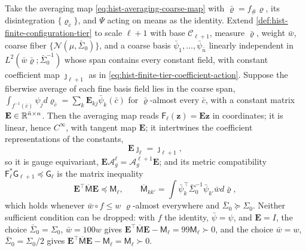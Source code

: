 Take the averaging map \eqref{eq:hist-averaging-coarse-map} with
\(\bar\varrho=f_\#\varrho\), its disintegration \(\{\varrho_{\bar c}\}\), and
\(\Psi\) acting on means as the identity. Extend
\cref{def:hist-finite-configuration-tier} to scale \(\ell+1\) with base
\(\mathcal C_{\ell+1}\), measure \(\bar\varrho\), weight \(\bar w\), coarse fiber
\(\{\mathcal N(\mu,\bar\Sigma_0)\}\), and a coarse basis
\(\bar\psi_1,\dots,\bar\psi_{\bar n}\) linearly independent in
\(L^2(\bar w\bar\varrho;\bar\Sigma_0^{-1})\) whose span contains every constant
field, with constant coefficient map \(\jmath_{\ell+1}\) as in
\eqref{eq:hist-finite-tier-coefficient-action}. Suppose the fiberwise average of
each fine basis field lies in the coarse span,
\(\int_{f^{-1}(\bar c)}\psi_jd\varrho_{\bar c}=\sum_k\mathbf E_{kj}\bar\psi_k(\bar c)\)
for \(\bar\varrho\)-almost every \(\bar c\), with a constant matrix
\(\mathbf E\in\mathbb R^{\bar n\times n}\). Then the averaging map reads
\(\mathsf F_\ell(\mathbf z)=\mathbf E\mathbf z\) in coordinates; it is linear,
hence \(C^\infty\), with tangent map \(\mathbf E\); it intertwines the coefficient
representations of the constants,
\begin{equation}
\mathbf E\jmath_\ell=\jmath_{\ell+1},
\label{eq:hist-finite-tier-coefficient-intertwining}
\end{equation}
so it is gauge equivariant, \(\mathbf E\mathscr A^\ell_g=\mathscr A^{\ell+1}_g\mathbf E\);
and its metric compatibility \(\mathsf F_\ell^*\mathsf G_{\ell+1}\preceq\mathsf G_\ell\)
is the matrix inequality
\begin{equation}
\mathbf E^\top\overline{\mathsf M}\mathbf E\preceq\mathsf M_\ell,
\qquad
\overline{\mathsf M}_{kk'}
=\int\bar\psi_k^\top\bar\Sigma_0^{-1}\bar\psi_{k'}\bar wd\bar\varrho,
\label{eq:hist-coarse-map-compatibility}
\end{equation}
which holds whenever \(\bar w\circ f\leq w\) \(\varrho\)-almost everywhere and
\(\bar\Sigma_0\succeq\Sigma_0\). Neither sufficient condition can be dropped:
with \(f\) the identity, \(\bar\psi=\psi\), and \(\mathbf E=I\), the choice
\(\bar\Sigma_0=\Sigma_0\), \(\bar w=100w\) gives
\(\mathbf E^\top\overline{\mathsf M}\mathbf E-\mathsf M_\ell=99\mathsf M_\ell\succ0\),
and the choice \(\bar w=w\), \(\bar\Sigma_0=\Sigma_0/2\) gives
\(\mathbf E^\top\overline{\mathsf M}\mathbf E-\mathsf M_\ell=\mathsf M_\ell\succ0\).

